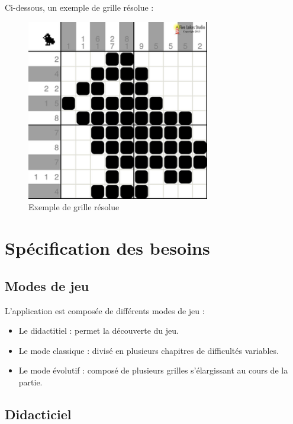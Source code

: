 \documentclass[a4paper, 12pt]{report}
\begin{document}
		Ci-dessous, un exemple de grille résolue :
		
	\begin{figure}[H]
		\centering
		\caption{Exemple de grille résolue}
		\includegraphics[width=8cm]{picross.png}
	\end{figure}
		
\chapter{Spécification des besoins}
\vspace*{0.5cm}

		\section{Modes de jeu}
		
			L'application est composée de différents modes de jeu :
			\begin{itemize}
            	\item Le didactitiel : permet la découverte du jeu.
            	\item Le mode classique : divisé en plusieurs chapitres de difficultés variables.
            	\item Le mode évolutif : composé de plusieurs grilles s'élargissant au cours de la partie.
        	\end{itemize}

	    \section{Didacticiel}
	    
\end{document}
